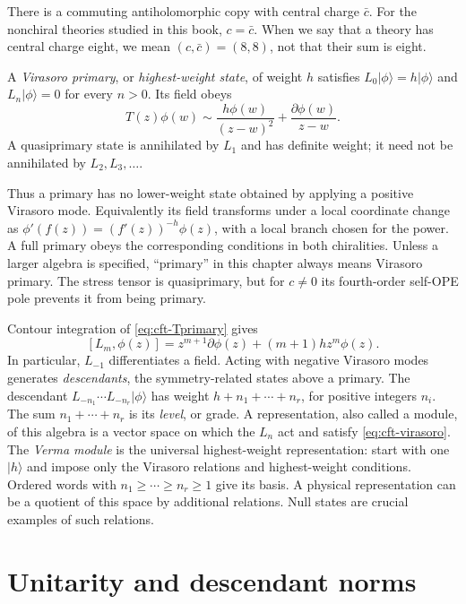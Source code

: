 There is a commuting antiholomorphic copy with central charge $\bar c$.
For the nonchiral theories studied in this book, $c=\bar c$.
When we say that a theory has central charge eight, we mean
$(c,\bar c)=(8,8)$, not that their sum is eight.

\begin{definition}
A \emph{Virasoro primary}, or \emph{highest-weight state}, of weight
$h$ satisfies
$L_0|\phi\rangle=h|\phi\rangle$ and
$L_n|\phi\rangle=0$ for every $n>0$. Its field obeys
\begin{equation}
 T(z)\phi(w)\sim\frac{h\phi(w)}{(z-w)^2}
                         +\frac{\partial\phi(w)}{z-w}.
 \label{eq:cft-Tprimary}
\end{equation}
A quasiprimary state is annihilated by $L_1$ and has definite weight;
it need not be annihilated by $L_2,L_3,\ldots$.
\end{definition}

Thus a primary has no lower-weight state obtained by applying a
positive Virasoro mode. Equivalently its field transforms under a
local coordinate change as
$\phi'(f(z))=(f'(z))^{-h}\phi(z)$, with a local branch chosen for
the power. A full primary obeys the corresponding conditions in both
chiralities. Unless a larger algebra is specified, ``primary'' in
this chapter always means Virasoro primary. The stress tensor is
quasiprimary, but for $c\ne0$ its fourth-order self-OPE pole prevents
it from being primary.

Contour integration of \eqref{eq:cft-Tprimary} gives
\[
 [L_m,\phi(z)]
 =z^{m+1}\partial\phi(z)+(m+1)h z^m\phi(z).
\]
In particular, $L_{-1}$ differentiates a field. Acting with negative
Virasoro modes generates \emph{descendants}, the symmetry-related
states above a primary. The descendant
$L_{-n_1}\cdots L_{-n_r}|\phi\rangle$ has weight
$h+n_1+\cdots+n_r$, for positive integers $n_i$. The sum
$n_1+\cdots+n_r$ is its \emph{level}, or grade. A representation,
also called a module, of this algebra is a vector space on which
the $L_n$ act and satisfy
\eqref{eq:cft-virasoro}. The \emph{Verma module} is the universal
highest-weight representation: start with one $|h\rangle$ and impose
only the Virasoro relations and highest-weight conditions. Ordered
words with $n_1\ge\cdots\ge n_r\ge1$ give its basis. A physical
representation can be a quotient of this space by additional
relations. Null states are crucial examples of such relations.

\section{Unitarity and descendant norms}

